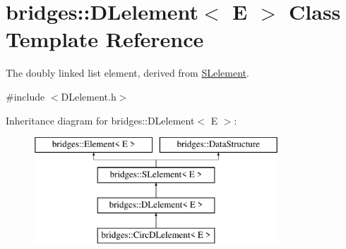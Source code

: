 \hypertarget{classbridges_1_1_d_lelement}{}\section{bridges\+::D\+Lelement$<$ E $>$ Class Template Reference}
\label{classbridges_1_1_d_lelement}


The doubly linked list element, derived from \mbox{\hyperlink{classbridges_1_1_s_lelement}{S\+Lelement}}.  




{\ttfamily \#include $<$D\+Lelement.\+h$>$}

Inheritance diagram for bridges\+::D\+Lelement$<$ E $>$\+:\begin{figure}[H]
\begin{center}
\leavevmode
\includegraphics[height=4.000000cm]{classbridges_1_1_d_lelement}
\end{center}
\end{figure}
